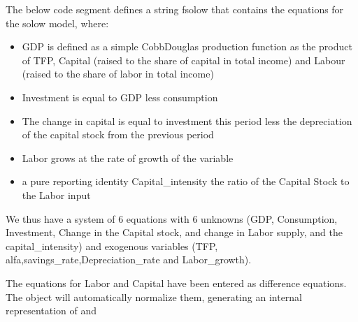 \documentclass[letterpaper,10pt,english]{jupyterBook}
\begin{document}
\sphinxAtStartPar
The below code segment defines a string fsolow that contains the equations for the solow model, where:
\begin{itemize}
\item {} 
\sphinxAtStartPar
GDP is defined as a simple Cobb\sphinxhyphen{}Douglas production function as the product of TFP, Capital (raised to the share of capital in total income) and Labour (raised to the share of labor in total income)

\item {} 
\sphinxAtStartPar
Investment is equal to GDP less consumption

\item {} 
\sphinxAtStartPar
The change in capital is equal to investment this period less the depreciation of the capital stock from the previous period

\item {} 
\sphinxAtStartPar
Labor grows at the rate of growth of the variable 

\item {} 
\sphinxAtStartPar
a pure reporting identity Capital\_intensity the ratio of the Capital Stock to the Labor input

\end{itemize}

\sphinxAtStartPar
We thus have a system of 6 equations with 6 unknowns (GDP, Consumption, Investment, Change in the Capital stock, and change in Labor supply, and the capital\_intensity) and exogenous variables (TFP, alfa,savings\_rate,Depreciation\_rate and Labor\_growth).

\sphinxAtStartPar
The equations for Labor and Capital have been entered as difference equations. The  object will automatically normalize them, generating an internal representation of  and 
\end{document}
